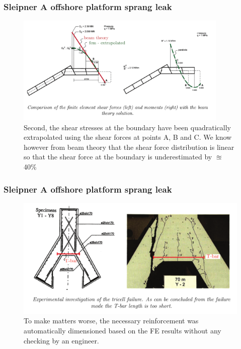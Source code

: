 \documentclass[notes]{beamer}
\begin{document}
\begin{frame}
\frametitle{Sleipner A offshore platform sprang leak}
\begin{figure}
	\centering
	\includegraphics[width=0.9\textwidth]{figs/sleipner-shear.png}
	\caption*{Second, the shear stresses at the boundary have been quadratically extrapolated using the shear forces at points A, B and C. We know however from beam theory that the shear force distribution is linear so that the shear force at the boundary is underestimated by $\approxeq$ 40\%}
\end{figure}
\end{frame}

\begin{frame}
\frametitle{Sleipner A offshore platform sprang leak}
\begin{figure}
	\centering
	\includegraphics[width=\textwidth]{figs/sleipner-reinforcement.png}
	\caption*{To make matters worse, the necessary reinforcement was automatically 
		dimensioned based on the FE results without any checking by an engineer.}
\end{figure}
\end{frame}
\end{document}
